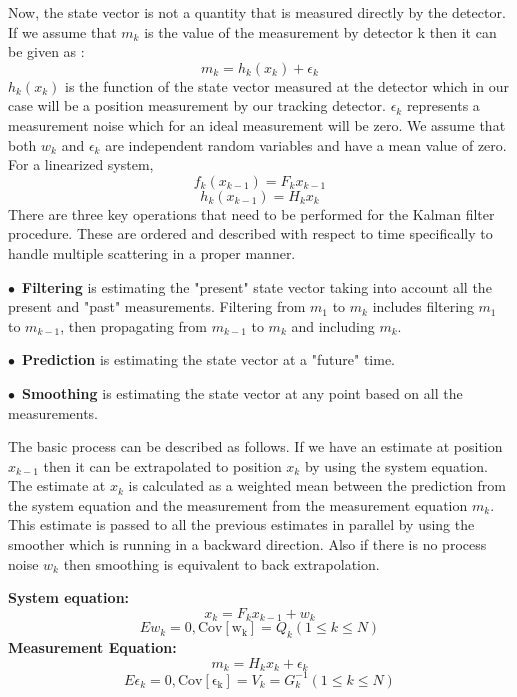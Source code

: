 Now, the state vector is not a quantity that is measured directly by the detector. If we assume that $m_k$ is the value of the measurement by detector k then it can be given as :
\begin{equation}
  m_k = h_k(x_k) + \epsilon_k
\end{equation}
$h_k(x_k)$ is the function of the state vector measured at the detector which in our case will be a position measurement by our tracking detector. $\epsilon_k$ represents a measurement noise which for an ideal measurement will be zero. We assume that both $w_k$ and $\epsilon_k$ are independent random variables and have a mean value of zero.
For a linearized system,
\begin{equation}
  f_k(x_{k-1}) = F_k x_{k-1}
\end{equation}
\begin{equation}
  h_k(x_{k-1}) = H_k x_k
\end{equation}
There are three key operations that need to be performed for the Kalman filter procedure. These are ordered and described with respect to time specifically to handle multiple scattering in a proper manner.
\begin{description}
  \item $\bullet$~\textbf{Filtering} is estimating the "present" state vector taking into account all the present and "past" measurements. Filtering from $m_1$ to $m_k$ includes filtering $m_1$ to $m_{k-1}$, then propagating from $m_{k-1}$ to $m_k$ and including $m_k$.
  \item $\bullet$~\textbf{Prediction} is estimating the state vector at a "future" time.
  \item $\bullet$~\textbf{Smoothing} is estimating the state vector at any point based on all the measurements.
\end{description}

The basic process can be described as follows. If we have an estimate at position $x_{k-1}$ then it can be extrapolated to position $x_k$ by using the system equation. The estimate at $x_k$ is calculated as a weighted mean between the prediction from the system equation and the measurement from the measurement equation $m_k$. This estimate is passed to all the previous estimates in parallel by using the smoother which is running in a backward direction. Also if there is no process noise $w_k$ then smoothing is equivalent to back extrapolation.

\textbf{System equation:}
\begin{equation}
  x_k = F_k x_{k-1} + w_{k}
\end{equation}
\begin{equation}
  E{w_k} = 0,  \mathrm{Cov[w_k]} = Q_k (1\leq k \leq N)
\end{equation}
\textbf{Measurement Equation:}
\begin{equation}
  m_k = H_k x_{k} + \epsilon_{k}
\end{equation}
\begin{equation}
  E{\epsilon_k} = 0,  \mathrm{Cov[\epsilon_k]} = V_k = G_k^{-1} (1\leq k \leq N)
\end{equation}

